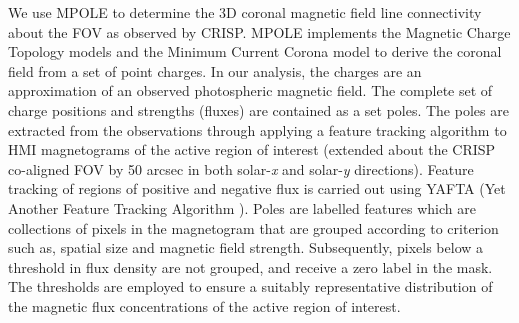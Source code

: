 	We use MPOLE to determine the 3D coronal magnetic field line connectivity about the FOV as observed by CRISP. MPOLE implements the Magnetic Charge Topology models and the Minimum Current Corona model  to derive the coronal field from a set of point charges. In our analysis, the charges are an approximation of an observed photospheric magnetic field. The complete set of charge positions and strengths (fluxes) are contained as a set poles. The poles are extracted from the observations through applying a feature tracking algorithm to HMI magnetograms of the active region of interest (extended about the CRISP co-aligned FOV by 50 arcsec in both solar-\textit{x} and solar-\textit{y} directions). Feature tracking of regions of positive and negative flux is carried out using YAFTA (Yet Another Feature Tracking Algorithm \citealt{DeForest2007}). Poles are labelled features which are collections of pixels in the magnetogram that are grouped according to criterion such as, spatial size and magnetic field strength. Subsequently, pixels below a threshold in flux density are not grouped, and receive a zero label in the mask. The thresholds are employed to ensure a suitably representative distribution of the  magnetic flux concentrations of the active region of interest.

